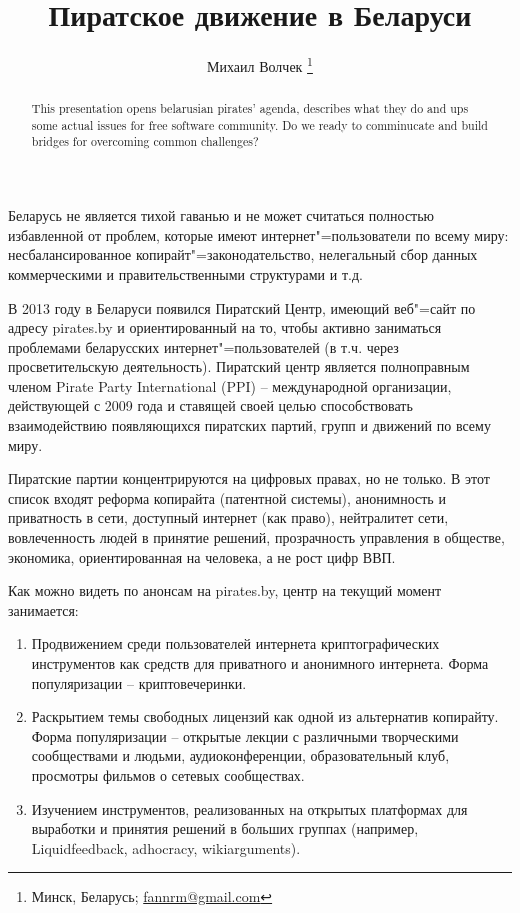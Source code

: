 \documentclass[10pt, a5paper]{article}
\begin{document}
\title{Пиратское движение в Беларуси}
\author{Михаил Волчек \footnote{Минск, Беларусь; \url{fannrm@gmail.com}}}
\maketitle
\begin{abstract}
This presentation opens belarusian pirates' agenda, describes what they do and ups some actual issues for free software \linebreak community. Do we ready to comminucate and build bridges for overcoming common challenges?
\end{abstract}
Беларусь не является тихой гаванью и не может считаться полностью избавленной от проблем, которые имеют интернет"=пользователи по всему миру: несбалансированное копирайт"=законодательство, нелегальный сбор данных коммерческими и правительственными структурами и т.д.

В 2013 году в Беларуси появился Пиратский Центр, имеющий веб"=сайт по адресу pirates.by и ориентированный на то, чтобы активно заниматься проблемами беларусских интернет"=пользователей (в т.ч. через просветительскую деятельность).
Пиратский центр является полноправным членом Pirate Party International (PPI) -- международной организации, действующей с 2009 года и ставящей своей целью способствовать взаимодействию появляющихся пиратских партий, групп и движений по всему миру.

Пиратские партии концентрируются на цифровых правах, но не только. В этот список входят реформа копирайта (патентной системы), анонимность и приватность в сети, доступный интернет (как право), нейтралитет сети, вовлеченность людей в принятие решений, прозрачность управления в обществе, экономика, ориентированная на человека, а не рост цифр ВВП.

Как можно видеть по анонсам на pirates.by, центр на текущий момент занимается:

\begin{enumerate}
  \item Продвижением среди пользователей интернета криптографических
инструментов как средств для приватного и анонимного интернета. Форма популяризации -- криптовечеринки.
  \item Раскрытием темы свободных лицензий как одной из альтернатив копирайту. Форма популяризации --  открытые лекции с различными творческими сообществами и людьми, аудиоконференции, образовательный клуб, просмотры фильмов о сетевых сообществах.
  \item Изучением инструментов, реализованных на открытых платформах для
выработки и принятия решений в больших группах (например,
Liquidfeedback, adhocracy, wikiarguments).
\end{enumerate}
\end{document}
